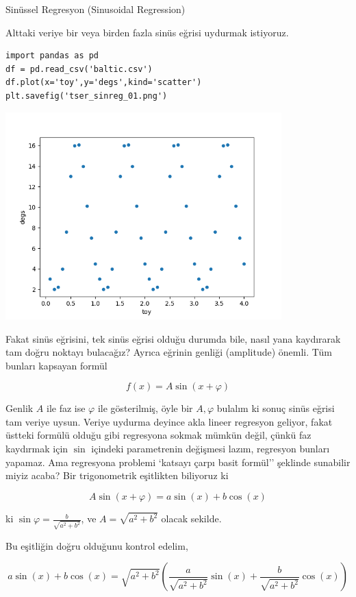 \documentclass[12pt,fleqn]{article}\usepackage{../../common}
\begin{document}
Sinüssel Regresyon (Sinusoidal Regression)

Alttaki veriye bir veya birden fazla sinüs eğrisi uydurmak istiyoruz. 

\begin{verbatim}
import pandas as pd
df = pd.read_csv('baltic.csv')
df.plot(x='toy',y='degs',kind='scatter')
plt.savefig('tser_sinreg_01.png')
\end{verbatim}

\includegraphics[height=8cm]{tser_sinreg_01.png}

Fakat sinüs eğrisini, tek sinüs eğrisi olduğu durumda bile, nasıl yana
kaydırarak tam doğru noktayı bulacağız? Ayrıca eğrinin genliği (amplitude)
önemli. Tüm bunları kapsayan formül

$$ f(x) = A \sin (x+\varphi) $$

Genlik $A$ ile faz ise $\varphi$ ile gösterilmiş, öyle bir $A,\varphi$ bulalım
ki sonuç sinüs eğrisi tam veriye uysun. Veriye uydurma deyince akla lineer
regresyon geliyor, fakat üstteki formülü olduğu gibi regresyona sokmak mümkün
değil, çünkü faz kaydırmak için $\sin$ içindeki parametrenin değişmesi lazım,
regresyon bunları yapamaz. Ama regresyona problemi `katsayı çarpı basit formül''
şeklinde sunabilir miyiz acaba? Bir trigonometrik eşitlikten biliyoruz ki

$$  A \sin (x+\varphi) = a\sin(x) + b\cos(x) $$

ki $\sin\varphi = \frac{b}{\sqrt{a^2+b^2}}$, ve $A = \sqrt{a^2+b^2}$ olacak  sekilde. 

Bu eşitliğin doğru olduğunu kontrol edelim,

$$ a \sin(x) + b \cos(x) = \sqrt{a^2+b^2} \left(\frac{a}{\sqrt{a^2+b^2}} \sin(x) + \frac{b}{\sqrt{a^2+b^2}} \cos(x)\right) $$
\end{document}
